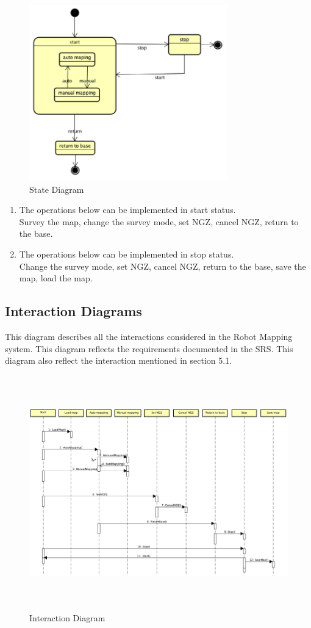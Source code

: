 \documentclass[11pt, a4paper]{article}
\begin{document}
\begin{figure}[H]
\centering
\includegraphics[height=3in]{SD}
\caption[State Diagram]{State Diagram}
\end{figure}

\begin{enumerate}
\item {The operations below can be implemented in start status.}\\
Survey the map, change the survey mode, set NGZ, cancel NGZ, return to the base.\\
\item {The operations below can be implemented in stop status.}\\
Change the survey mode, set NGZ, cancel NGZ, return to the base, save the map, load the map.\\
\end{enumerate}
\newpage

\subsection{Interaction Diagrams}
This diagram describes all the interactions considered in the Robot Mapping system. This diagram reflects the requirements documented in the SRS. This diagram also reflect the interaction mentioned in section 5.1.

\begin{figure}[H]
\centering
\includegraphics[height=4in]{ID}
\caption[Interaction Diagram]{Interaction Diagram}
\end{figure}
\newpage
\end{document}
